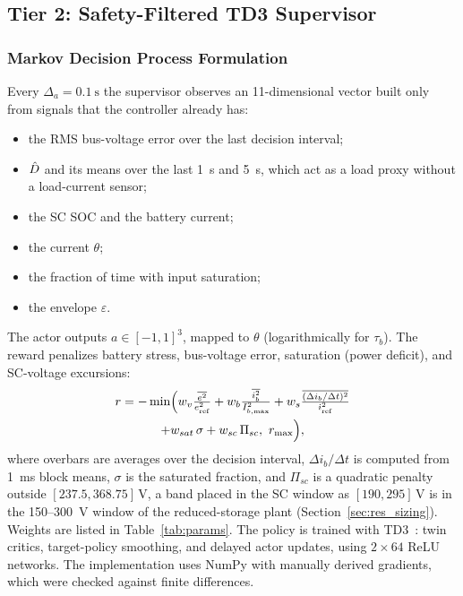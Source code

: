 \subsection{Tier 2: Safety-Filtered TD3 Supervisor}\label{sec:tier2}

\subsubsection{Markov Decision Process Formulation}
Every $\Delta_a=\SI{0.1}{\second}$ the supervisor observes an 11-dimensional vector built only from signals that the controller already has:
\begin{itemize}
\item the RMS bus-voltage error over the last decision interval;
\item $\hat{D}$ and its means over the last \SI{1}{\second} and \SI{5}{\second}, which act as a load proxy without a load-current sensor;
\item the SC SOC and the battery current;
\item the current $\theta$;
\item the fraction of time with input saturation;
\item the envelope $\varepsilon$.
\end{itemize}
The actor outputs $a\in[-1,1]^3$, mapped to $\theta$ (logarithmically for $\tau_b$). The reward penalizes battery stress, bus-voltage error, saturation (power deficit), and SC-voltage excursions:
\begin{multline}
r=-\min\!\Big(w_v\tfrac{\overline{e^2}}{e_{\rm ref}^2}+w_b\tfrac{\overline{i_b^2}}{I_{b,\max}^2}+w_s\tfrac{\overline{(\Delta i_b/\Delta t)^2}}{\dot\imath_{\rm ref}^2}\\
+w_{sat}\,\sigma+w_{sc}\,\Pi_{sc},\ r_{\max}\Big),\label{eq:reward}
\end{multline}
where overbars are averages over the decision interval, $\Delta i_b/\Delta t$ is computed from \SI{1}{\milli\second} block means, $\sigma$ is the saturated fraction, and $\Pi_{sc}$ is a quadratic penalty outside $[237.5,368.75]$\,V, a band placed in the SC window as $[190,295]$\,V is in the 150--\SI{300}{V} window of the reduced-storage plant (Section~\ref{sec:res_sizing}). Weights are listed in Table~\ref{tab:params}. The policy is trained with TD3~\cite{fujimoto2018td3}: twin critics, target-policy smoothing, and delayed actor updates, using $2\times64$ ReLU networks. The implementation uses NumPy with manually derived gradients, which were checked against finite differences.

